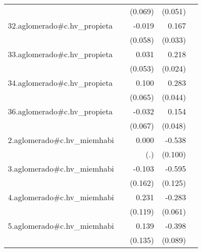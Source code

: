 {\begin{longtable}{l*{4}{D{.}{.}{-1}}}
            &                     &     (0.069)         &     (0.051)         &                     \\
\addlinespace
32.aglomerado#c.hv\_propieta&                     &      -0.019         &       0.167\sym{***}&                     \\
            &                     &     (0.058)         &     (0.033)         &                     \\
\addlinespace
33.aglomerado#c.hv\_propieta&                     &       0.031         &       0.218\sym{***}&                     \\
            &                     &     (0.053)         &     (0.024)         &                     \\
\addlinespace
34.aglomerado#c.hv\_propieta&                     &       0.100         &       0.283\sym{***}&                     \\
            &                     &     (0.065)         &     (0.044)         &                     \\
\addlinespace
36.aglomerado#c.hv\_propieta&                     &      -0.032         &       0.154\sym{**} &                     \\
            &                     &     (0.067)         &     (0.048)         &                     \\
\addlinespace
2.aglomerado#c.hv\_miemhabi&                     &       0.000         &      -0.538\sym{***}&                     \\
            &                     &         (.)         &     (0.100)         &                     \\
\addlinespace
3.aglomerado#c.hv\_miemhabi&                     &      -0.103         &      -0.595\sym{***}&                     \\
            &                     &     (0.162)         &     (0.125)         &                     \\
\addlinespace
4.aglomerado#c.hv\_miemhabi&                     &       0.231         &      -0.283\sym{***}&                     \\
            &                     &     (0.119)         &     (0.061)         &                     \\
\addlinespace
5.aglomerado#c.hv\_miemhabi&                     &       0.139         &      -0.398\sym{***}&                     \\
            &                     &     (0.135)         &     (0.089)         &                     \\

\end{longtable}}
